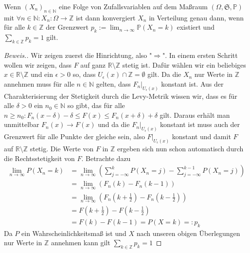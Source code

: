 \begin{lemma}
    Wenn $(X_n)_{n\in\mathbb{N}}$ eine Folge von Zufallsvariablen auf dem Maßraum $(\Omega,\mathfrak{S},\mathbb{P})$ mit $\forall n\in\mathbb{N}:X_n:\Omega\to\mathbb{Z}$ ist dann konvergiert $X_n$ in Verteilung genau dann, wenn für alle $k\in\mathbb{Z}$ der Grenzwert $p_k:=\lim_{n\to\infty}\mathbb{P}(X_n=k)$ existiert und $\sum_{k\in\mathbb{Z}}p_k=1$ gilt.
\end{lemma}
\begin{proof}[Beweis.]
    Wir zeigen zuerst die Hinrichtung, also "$\Rightarrow$". In einem ersten Schritt wollen wir zeigen, dass $F$ auf ganz $\mathbb{R}\setminus\mathbb{Z}$ stetig ist. Dafür wählen wir ein beliebiges $x\in\mathbb{R}\setminus\mathbb{Z}$ und ein $\epsilon>0$ so, dass $U_\epsilon(x)\cap\mathbb{Z}=\emptyset$ gilt. Da die $X_n$ nur Werte in $\mathbb{Z}$ annehmen muss für alle $n\in\mathbb{N}$ gelten, dass $F_n\vert_{U_\epsilon(x)}$ konstant ist. Aus der Charakterisierung der Stetigkeit durch die Levy-Metrik wissen wir, dass es für alle $\delta>0$ ein $n_0\in\mathbb{N}$ so gibt, das für alle $n\geq n_0:F_n(x-\delta)-\delta\leq F(x)\leq F_n(x+\delta)+\delta$ gilt. Daraus erhält man unmittelbar $F_n(x)\to F(x)$ und da die $F_n\vert_{U_\epsilon(x)}$ konstant ist muss auch der Grenzwert für alle Punkte der gleiche sein, also $F\vert_{U_\epsilon(x)}$ konstant und damit $F$ auf $\mathbb{R}\setminus\mathbb{Z}$ stetig. Die Werte von $F$ in $\mathbb{Z}$ ergeben sich nun schon automatisch durch die Rechtsstetigkeit von $F$. Betrachte dazu
    \begin{align*}
        \lim_{n\to\infty}P(X_n = k)&=\lim_{n\to\infty}\left(\sum_{j=-\infty}^kP(X_n=j)-\sum_{j=-\infty}^{k-1}P(X_n=j)\right)\\
        &=\lim_{n\to\infty}\left(F_n(k)-F_n(k-1)\right)\\
        &=\lim_{n\to\infty}\left(F_n\left(k+\frac{1}{2}\right)-F_n\left(k-\frac{1}{2}\right)\right)\\
        &=F\left(k+\frac{1}{2}\right)-F\left(k-\frac{1}{2}\right)\\
        &=F(k)-F(k-1)=P(X=k)=:p_k
    \end{align*}
    Da $P$ ein Wahrscheinlichkeitsmaß ist und $X$ nach unseren obigen Überlegungen nur Werte in $\mathbb{Z}$ annehmen kann gilt $\sum_{k\in\mathbb{Z}}p_k=1$
\end{proof}